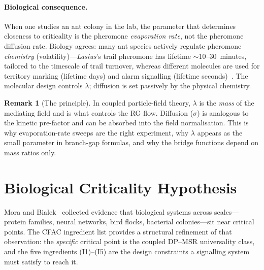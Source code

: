 \documentclass[10pt,a4paper,twocolumn]{article}
\theoremstyle{definition}
\newtheorem*{remark}{Remark}
\begin{document}
\paragraph{Biological consequence.}
When one studies an ant colony in the lab, the parameter that
determines closeness to criticality is the pheromone
\emph{evaporation rate}, not the pheromone diffusion rate.
Biology agrees: many ant species actively regulate pheromone
\emph{chemistry} (volatility)---\textit{Lasius}'s trail
pheromone has lifetime $\sim 10$--$30$~minutes, tailored to the
timescale of trail turnover, whereas different molecules are
used for territory marking (lifetime days) and alarm signalling
(lifetime seconds)~\citep{HollDorigo1999,Jackson2006}.  The
molecular design controls $\lambda$; diffusion is set passively
by the physical chemistry.

\begin{remark}[The principle]\label{rem:evap-mass}
In coupled particle-field theory, $\lambda$ is the
\emph{mass} of the mediating field and is what controls the
RG flow.  Diffusion ($\sigma$) is analogous to the kinetic
pre-factor and can be absorbed into the field normalisation.
This is why evaporation-rate sweeps are the right experiment,
why $\lambda$ appears as the small parameter in branch-gap
formulas, and why the bridge functions depend on mass ratios
only.
\end{remark}

\section{Biological Criticality Hypothesis}\label{sec:biology}

Mora and Bialek~\citep{MoraBialek2011} collected evidence that
biological systems across scales---protein families, neural
networks, bird flocks, bacterial colonies---sit near critical
points.  The CFAC ingredient list provides a structural
refinement of that observation: the \emph{specific} critical
point is the coupled DP--MSR universality class, and the five
ingredients (I1)--(I5) are the design constraints a signalling
system must satisfy to reach it.
\end{document}

